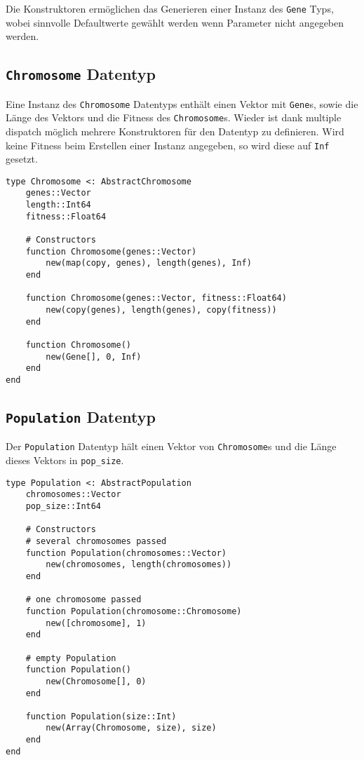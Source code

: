 Die Konstruktoren ermöglichen das Generieren einer Instanz des \texttt{Gene} Typs, wobei sinnvolle Defaultwerte gewählt werden wenn Parameter nicht angegeben werden.

\subsection{\texttt{Chromosome} Datentyp}

Eine Instanz des \texttt{Chromosome} Datentyps enthält einen Vektor mit \texttt{Gene}s, sowie die Länge des Vektors und die Fitness des \texttt{Chromosome}s. 
Wieder ist dank multiple dispatch möglich mehrere Konstruktoren für den Datentyp zu definieren.  
Wird keine Fitness beim Erstellen einer Instanz angegeben, so wird diese auf \texttt{Inf} gesetzt.

\begin{Verbatim}
type Chromosome <: AbstractChromosome
    genes::Vector
    length::Int64
    fitness::Float64

    # Constructors
    function Chromosome(genes::Vector) 
        new(map(copy, genes), length(genes), Inf)
    end

    function Chromosome(genes::Vector, fitness::Float64)
        new(copy(genes), length(genes), copy(fitness))
    end

    function Chromosome()
        new(Gene[], 0, Inf)
    end
end
\end{Verbatim}

\subsection{\texttt{Population} Datentyp}
Der \texttt{Population} Datentyp hält einen Vektor von \texttt{Chromosome}s und die Länge dieses Vektors in \texttt{pop\_size}.
\begin{Verbatim}
type Population <: AbstractPopulation
    chromosomes::Vector
    pop_size::Int64

    # Constructors
    # several chromosomes passed
    function Population(chromosomes::Vector) 
        new(chromosomes, length(chromosomes))
    end

    # one chromosome passed
    function Population(chromosome::Chromosome) 
        new([chromosome], 1)
    end

    # empty Population
    function Population()
        new(Chromosome[], 0)
    end
                                                                          
    function Population(size::Int)
        new(Array(Chromosome, size), size)
    end
end
\end{Verbatim}

